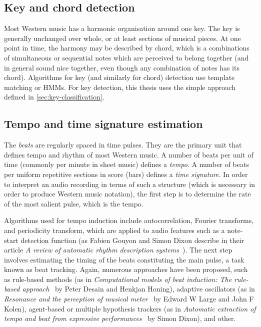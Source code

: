 \subsection{Key and chord detection}\label{subsec:key-and-chord-detection}
Most Western music has a harmonic organisation around one key. The key is generally unchanged over whole, or at least
sections of musical pieces. At one point in time, the harmony may be described by chord, which is a combinations of
simultaneous or sequential notes which are perceived to belong together (and in general sound nice together, even though
any combination of notes has its chord). Algorithms for key (and similarly for chord) detection use template matching or
\acp{HMM}. For key detection, this thesis uses the simple approach defined in \cref{sec:key-classification}.

\subsection{Tempo and time signature estimation}\label{subsec:tempo-and-time-signature-estimation}
The \textit{beats} are regularly spaced in time pulses. They are the primary unit that defines tempo and rhythm of most
Western music. A number of beats per unit of time (commonly per minute in sheet music) defines a \textit{tempo}. A number
of beats per uniform repetitive sections in score (bars) defines a \textit{time signature}. In order to interpret an audio
recording in terms of such a structure (which is necessary in order to produce Western music notation), the first step
is to determine the rate of the most salient pulse, which is the tempo.

Algorithms used for tempo induction include autocorrelation, Fourier transforms, and periodicity transform, which are
applied to audio features such as a note-start detection function (as Fabien Gouyon and Simon Dixon describe in their
article \textit{A review of automatic rhythm description systems}~\cite{gouyon2005review}). The next step involves
estimating the timing of the beats constituting the main pulse, a task known as beat tracking. Again, numerous
approaches have been proposed, such as rule-based methods (as in \textit{Computational models of beat induction:
The rule-based approach}~\cite{desain1999computational} by Peter Desain and Henkjan Honing), adaptive oscillators (as
in \textit{Resonance and the perception of musical meter}~\cite{large1994resonance} by Edward W Large and John F Kolen),
agent-based or multiple hypothesis trackers (as in \textit{Automatic extraction of tempo and beat from expressive
performances}~\cite{dixon2001automatic} by Simon Dixon), and other.

